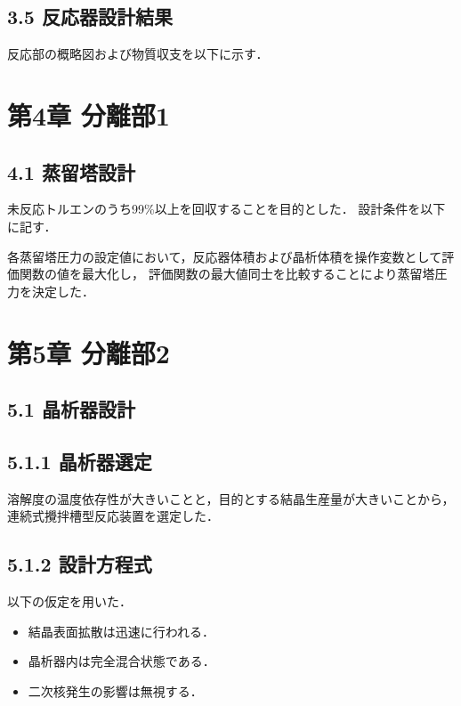 \documentclass[a4j, titlepage]{jsarticle}
\begin{document}
\subsection*{3.5 反応器設計結果}
反応部の概略図および物質収支を以下に示す．

\newpage
\section*{第4章 分離部1}
\subsection*{4.1 蒸留塔設計}
未反応トルエンのうち99\%以上を回収することを目的とした．
設計条件を以下に記す．

各蒸留塔圧力の設定値において，反応器体積および晶析体積を操作変数として評価関数の値を最大化し，
評価関数の最大値同士を比較することにより蒸留塔圧力を決定した．

\newpage
\section*{第5章 分離部2}
\subsection*{5.1 晶析器設計}
\subsection*{5.1.1 晶析器選定}
溶解度の温度依存性が大きいことと，目的とする結晶生産量が大きいことから，
連続式攪拌槽型反応装置を選定した．
\subsection*{5.1.2 設計方程式}
以下の仮定を用いた．
\begin{itemize}
    \item 結晶表面拡散は迅速に行われる．\\
    \item 晶析器内は完全混合状態である．\\
    \item 二次核発生の影響は無視する．
\end{itemize}
\end{document}
